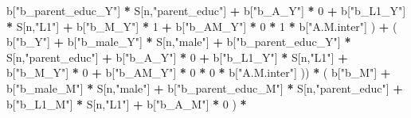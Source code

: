 \documentclass[
]{book}
\newenvironment{Shaded}{\begin{snugshade}}{\end{snugshade}}
\newcommand{\DecValTok}[1]{\textcolor[rgb]{0.00,0.00,0.81}{#1}}
\newcommand{\NormalTok}[1]{#1}
\newcommand{\SpecialCharTok}[1]{\textcolor[rgb]{0.81,0.36,0.00}{\textbf{#1}}}
\newcommand{\StringTok}[1]{\textcolor[rgb]{0.31,0.60,0.02}{#1}}
\begin{document}
\begin{Shaded}
\begin{Highlighting}[]
\NormalTok{                                 b[}\StringTok{"b\_parent\_educ\_Y"}\NormalTok{] }\SpecialCharTok{*}\NormalTok{ S[n,}\StringTok{"parent\_educ"}\NormalTok{] }\SpecialCharTok{+} 
\NormalTok{                                 b[}\StringTok{"b\_A\_Y"}\NormalTok{] }\SpecialCharTok{*} \DecValTok{0} \SpecialCharTok{+} 
\NormalTok{                                 b[}\StringTok{"b\_L1\_Y"}\NormalTok{] }\SpecialCharTok{*}\NormalTok{ S[n,}\StringTok{"L1"}\NormalTok{] }\SpecialCharTok{+}
\NormalTok{                                 b[}\StringTok{"b\_M\_Y"}\NormalTok{] }\SpecialCharTok{*} \DecValTok{1} \SpecialCharTok{+}
\NormalTok{                                 b[}\StringTok{"b\_AM\_Y"}\NormalTok{] }\SpecialCharTok{*} \DecValTok{0} \SpecialCharTok{*} \DecValTok{1} \SpecialCharTok{*}\NormalTok{ b[}\StringTok{"A.M.inter"}\NormalTok{] ) }\SpecialCharTok{+} 
\NormalTok{                             ( b[}\StringTok{"b\_Y"}\NormalTok{] }\SpecialCharTok{+} 
\NormalTok{                                 b[}\StringTok{"b\_male\_Y"}\NormalTok{] }\SpecialCharTok{*}\NormalTok{ S[n,}\StringTok{"male"}\NormalTok{] }\SpecialCharTok{+} 
\NormalTok{                                 b[}\StringTok{"b\_parent\_educ\_Y"}\NormalTok{] }\SpecialCharTok{*}\NormalTok{ S[n,}\StringTok{"parent\_educ"}\NormalTok{] }\SpecialCharTok{+} 
\NormalTok{                                 b[}\StringTok{"b\_A\_Y"}\NormalTok{] }\SpecialCharTok{*} \DecValTok{0} \SpecialCharTok{+} 
\NormalTok{                                 b[}\StringTok{"b\_L1\_Y"}\NormalTok{] }\SpecialCharTok{*}\NormalTok{ S[n,}\StringTok{"L1"}\NormalTok{] }\SpecialCharTok{+}
\NormalTok{                                 b[}\StringTok{"b\_M\_Y"}\NormalTok{] }\SpecialCharTok{*} \DecValTok{0} \SpecialCharTok{+}
\NormalTok{                                 b[}\StringTok{"b\_AM\_Y"}\NormalTok{] }\SpecialCharTok{*} \DecValTok{0} \SpecialCharTok{*} \DecValTok{0} \SpecialCharTok{*}\NormalTok{ b[}\StringTok{"A.M.inter"}\NormalTok{] )) }\SpecialCharTok{*}
\NormalTok{      ( b[}\StringTok{"b\_M"}\NormalTok{] }\SpecialCharTok{+} 
\NormalTok{          b[}\StringTok{"b\_male\_M"}\NormalTok{] }\SpecialCharTok{*}\NormalTok{ S[n,}\StringTok{"male"}\NormalTok{] }\SpecialCharTok{+} 
\NormalTok{          b[}\StringTok{"b\_parent\_educ\_M"}\NormalTok{] }\SpecialCharTok{*}\NormalTok{ S[n,}\StringTok{"parent\_educ"}\NormalTok{] }\SpecialCharTok{+} 
\NormalTok{          b[}\StringTok{"b\_L1\_M"}\NormalTok{] }\SpecialCharTok{*}\NormalTok{ S[n,}\StringTok{"L1"}\NormalTok{] }\SpecialCharTok{+}
\NormalTok{          b[}\StringTok{"b\_A\_M"}\NormalTok{] }\SpecialCharTok{*} \DecValTok{0}\NormalTok{ ) }\SpecialCharTok{*} 

\end{Highlighting}
\end{Shaded}
\end{document}

